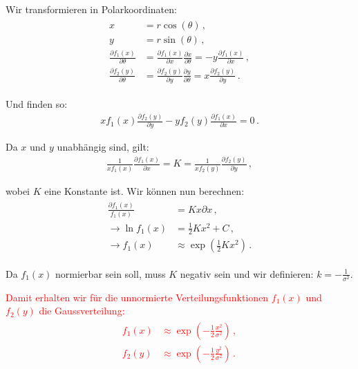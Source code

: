 Wir transformieren in Polarkoordinaten:
\begin{align}
\begin{split}
x &= r \cos (\theta)\,,\\[5pt]
y &= r \sin (\theta)\,,\\[5pt]
\frac{ \partial f_1(x) }{ \partial \theta } &= \frac{ \partial f_1(x) }{ \partial x } \frac{ \partial x }{ \partial \theta } = -y \frac{ \partial f_1 (x) }{ \partial x }\,,\\[5pt]
\frac{ \partial f_2(y) }{ \partial \theta } &= \frac{ \partial f_2(y) }{ \partial y } \frac{ \partial y }{ \partial \theta } = x \frac{ \partial f_2 (y) }{ \partial y }\,.
\label{eq:vl5-36}
\end{split}
\end{align}

Und finden so:
\begin{align}
x f_1(x) \frac{ \partial f_2(y) }{ \partial y } - y f_2(y) \frac{ \partial f_1(x) }{ \partial x } = 0 \,.
\label{eq:vl5-37}
\end{align}

Da $x$ und $y$ unabh\"angig sind, gilt:
\begin{align}
\frac{ 1 }{ x f_1(x) } \frac{ \partial f_1(x) }{ \partial x } = K = \frac{ 1 }{ x f_2(y) } \frac{ \partial f_2(y) }{ \partial y } \,,
\label{eq:vl5-38}
\end{align}

wobei $K$ eine Konstante ist. Wir k\"onnen nun berechnen:
\begin{align}
\begin{split}
\frac{ \partial f_1(x) }{ f_1(x) } &= Kx \partial x\,,\\
\rightarrow \ln f_1(x) &= \frac{1}{2} K x^2 + C\,,\\
\rightarrow f_1(x) &\approx \exp \left( \frac{1}{2} K x^2\right)\,.
\label{eq:vl5-39}
\end{split}
\end{align}

Da $f_1(x)$ normierbar sein soll, muss $K$ negativ sein und wir definieren: $k = - \frac{1}{\sigma^2}$.

\begin{center}
\textcolor{red}{
Damit erhalten wir f\"ur die unnormierte Verteilungsfunktionen $f_1(x)$ und $f_2(y)$ die Gaussverteilung:
\begin{align}
\begin{split}
f_1(x) &\approx \exp \left( - \frac{1}{2} \frac{ x^2 }{ \sigma^2 } \right)\,,\\
f_2(y) &\approx \exp \left( - \frac{1}{2} \frac{ y^2 }{ \sigma^2 } \right)\,.
\label{eq:vl5-40}
\end{split}
\end{align}}
\end{center}

